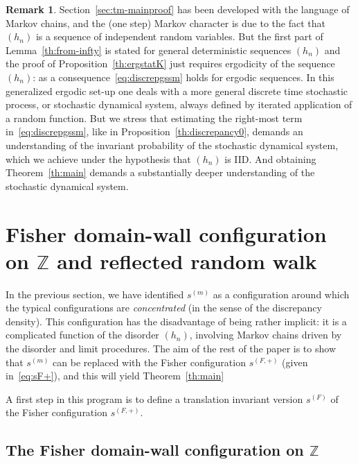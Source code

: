 \documentclass[10pt]{amsart}
\theoremstyle{definition}\newtheorem{defi}[theo]{Definition}\newtheorem{rema}[theo]{Remark}\newtheorem{exam}[theo]{Example}\newtheorem{exem}[theo]{Example}\newtheorem{nota}[theo]{Notation}
\newcommand{\bbZ}{\mathbb{Z}}
\begin{document}
\begin{rema}\label{rem:gen-erg}
Section~\ref{sec:tm-mainproof} has been developed with the language of Markov chains, and the (one step) Markov character is due to the fact that $(h_n)$ is a sequence of independent random variables. But the first part of Lemma~\ref{th:from-infty} is stated for general deterministic sequences $(h_n)$ and the proof of Proposition~\ref{th:ergstatK} just requires ergodicity of the sequence $(h_n)$: as a consequence~\eqref{eq:discrepgssm} holds for ergodic sequences. In this generalized ergodic set-up one deals with a more general discrete time stochastic process, or stochastic dynamical system, always defined by iterated application of a random function. But we stress that estimating the right-most term in~\eqref{eq:discrepgssm}, like in Proposition~\ref{th:discrepancy0}, demands an understanding of the invariant probability of the stochastic dynamical system, which we achieve under the hypothesis that $(h_n)$ is IID. And obtaining Theorem~\ref{th:main} demands a substantially deeper understanding of the stochastic dynamical system.
\end{rema}


\section{Fisher domain-wall configuration on \texorpdfstring{$\bbZ$}{bbZ} and reflected random walk}\label{sec:auxiliary}


In the previous section, we have identified $s^{(m)}$ as a configuration around which the typical configurations are \emph{concentrated} (in the sense of the discrepancy density). This configuration has the disadvantage of being rather implicit: it is a complicated function of the disorder $(h_n)$, involving Markov chains driven by the disorder and limit procedures. The aim of the rest of the paper is to show that $s^{(m)}$ can be replaced with the Fisher configuration $s^{(F, +)}$ (given in~\eqref{eq:sF+}), and this will yield Theorem~\ref{th:main}

A first step in this program is to define a translation invariant version $s^{(F)}$ of the Fisher configuration $s^{(F, +)}$.

\subsection{The Fisher domain-wall configuration on \texorpdfstring{$\bbZ$}{bbZ}}\label{sec:Fisher-Z}
\end{document}
